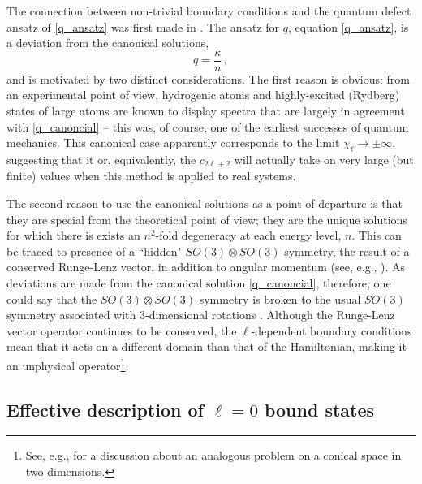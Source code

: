 \documentclass[pra,twocolumn,nofootinbib, superscriptaddress]{revtex4}%
\def\ssec#1{\subsection{#1} }
\def\f#1#2{\frac{#1}{#2}}
\def\k{\kappa}
\begin{document}
The connection between non-trivial boundary conditions and the quantum defect ansatz of \eqref{q_ansatz} was first made in \cite{BeckThesis}. The ansatz for $q$, equation \eqref{q_ansatz}, is a deviation from the canonical solutions,
\begin{equation}\label{q_canoncial}
q=\f{\k}{n}\,,
\end{equation}
and is motivated by two distinct considerations. The first reason is obvious: from an experimental point of view, hydrogenic atoms and highly-excited (Rydberg) states of large atoms are known to display spectra that are largely in agreement with \eqref{q_canoncial} -- this was, of course, one of the earliest successes of quantum mechanics. This canonical case apparently corresponds to the limit $\chi_\ell\to \pm\infty$, suggesting that it or, equivalently, the $c_{2\ell+2}$ will actually take on very large (but finite) values when this method is applied to real systems.

The second reason to use the canonical solutions as a point of departure is that they are special from the theoretical point of view; they are the unique solutions for which there is exists an $n^2$-fold  degeneracy at each energy level, $n$. This can be traced to presence of a ``hidden" $SO(3)\otimes SO(3)$ symmetry, the result of a conserved Runge-Lenz vector, in addition to angular momentum (see, e.g., \cite{weinberg2012lectures}).   As deviations are made from the canonical solution \eqref{q_canoncial}, therefore, one could say that the $SO(3)\otimes SO(3)$ symmetry is broken to the usual $SO(3)$ symmetry associated with 3-dimensional rotations \cite{BeckThesis}.   Although the Runge-Lenz vector operator continues to be conserved, the $\ell$-dependent boundary conditions mean that it acts on a different domain than that of the Hamiltonian, making it an unphysical operator\footnote{See, e.g.,  \cite{AlHashimi:2007ci} for a discussion about an analogous problem on a conical space in two dimensions.}. 



  

  

 


\ssec{Effective description of $\ell=0$ bound states}\label{lzero_bound_states}
\end{document}
